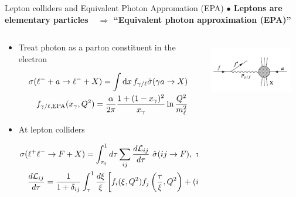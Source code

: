 \documentclass[aspectratio=169]{beamer}
\begin{document}
\begin{frame}{Lepton colliders and Equivalent Photon Appromation (EPA)}
	\vspace{1mm} \textcolor{PittRoyal}{\bf $\bullet$ Leptons are elementary particles}{\bf ~~$\Rightarrow$ ``Equivalent photon approximation (EPA)''}

		\begin{columns}
			\begin{column}{0.64\textwidth}
				\begin{itemize}
					\item  Treat photon as a parton constituent in the electron  %
					\begin{small}
					\begin{eqnarray}
						\sigma(\ell^- +a \to \ell^- +X) =\int \dd x \,f_{\gamma/\ell} {\hat \sigma}(\gamma a\to X) \nonumber \\
						f_{\gamma/\ell,\textrm{EPA}}(x_\gamma,Q^2)=\frac{\alpha}{2\pi}\frac{1+(1-x_\gamma)^2}{x_\gamma}\ln{Q^2 \over m_\ell^2}\nonumber 
					\end{eqnarray}
					\end{small}
				\item At lepton colliders
				\begin{small}
				\begin{eqnarray}
					\sigma(\ell^+\ell^- \rightarrow F + X) = \int_{\tau_{0}}^{1} d\tau  \sum_{ij}\frac{d\mathcal{L}_{ij}}{d\tau}\  \hat{\sigma}(ij\rightarrow F), ~\tau = \hat s/s\nonumber\\
					{ d\mathcal{L}_{ij} \over {d\tau} } = \frac{1}{1+\delta_{ij}}  \int^{1}_{\tau} \frac{d\xi}{\xi} \left[ f_{i}(\xi, Q^{2})f_{j}\left(\frac{\tau}{\xi},Q^{2} \right) + (i \leftrightarrow j) \right] \nonumber
				\end{eqnarray}
			\end{small}
			\end{itemize}
			\end{column}
			\begin{column}{0.38\textwidth}
				\begin{center}
				\includegraphics[width=0.9\textwidth,height=2.5cm]{figs/EPA.png}

\end{center}
\end{column}
\end{columns}
\end{frame}
\end{document}
